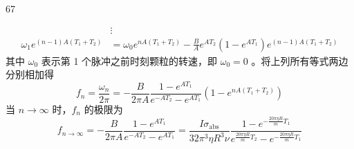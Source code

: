 \begin{solution}{67}
\begin{subsolution}
\begin{align*}
            &\vdots \\
            \omega_{1} e^{(n-1)A(T_{1}+T_{2})} &= \omega_{0} e^{nA(T_{1}+T_{2})} - \frac{B}{A} e^{A T_{2}}(1 - e^{A T_{1}}) e^{(n-1)A(T_{1}+T_{2})}
        \end{align*}
        其中 $\omega_{0}$ 表示第 1 个脉冲之前时刻颗粒的转速，即 $\omega_{0}=0$ 。将上列所有等式两边分别相加得
        \begin{equation}
            f_{n} = \frac{\omega_{n}}{2\pi} = -\frac{B}{2\pi A} \frac{1 - e^{A T_{1}}}{e^{-A T_{2}} - e^{A T_{1}}} \left(1 - e^{nA(T_{1}+T_{2})}\right) \label{eq:19.p67}
        \end{equation}
        当 $n\to\infty$ 时，$f_{n}$ 的极限为
        \begin{equation}
            f_{n\to\infty} = -\frac{B}{2\pi A} \frac{1 - e^{A T_{1}}}{e^{-A T_{2}} - e^{A T_{1}}} = \frac{I\sigma_{\mathrm{abs}}}{32\pi^{3}\eta R^{3}\nu} \frac{1 - e^{-\frac{20\pi\eta R}{m}T_{1}}}{e^{\frac{20\pi\eta R}{m}T_{2}} - e^{-\frac{20\pi\eta R}{m}T_{1}}} \label{eq:20.p67}
        \end{equation}
    \end{subsolution}
\end{solution}